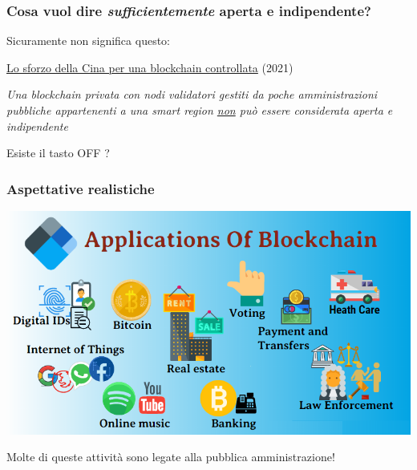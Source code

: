 \documentclass[11pt]{beamer}  %
\begin{document}
\begin{frame}\frametitle{Cosa vuol dire \emph{sufficientemente} aperta e indipendente?}

  Sicuramente non significa questo:
  \begin{center}
    \href{https://www.coindesk.com/china-to-create-it-can-control}{Lo sforzo della Cina per una blockchain controllata} (2021)
  \end{center}

  \medskip

  \begin{center}
    {\color{red}\emph{Una blockchain privata con nodi validatori gestiti da poche amministrazioni pubbliche appartenenti a una smart region
    \underline{non} pu\`o essere considerata aperta e indipendente}}
  \end{center}

  \medskip

  \begin{center}
    {\color{blue}{Si potrebbe immaginare una blockchain a livello europeo, con regole di ingresso e selezione di nodi validatori applicabili
    sia a societ\`a private che ad amministrazioni pubbliche degli Stati membri, con meccanismi premiali e di rotazione imposti da smart contract}}
  \end{center}

  \medskip

  \begin{center}
    Esiste il tasto OFF ?
  \end{center}
  
\end{frame}

\begin{frame}\frametitle{Aspettative realistiche}

  \begin{center}
    \includegraphics[scale=0.4,clip=false]{pictures/blockchain-applications.png}
  \end{center}

  \begin{center}
    Molte di queste attivit\`a sono legate alla pubblica amministrazione!
  \end{center}
  
\end{frame}
\end{document}
